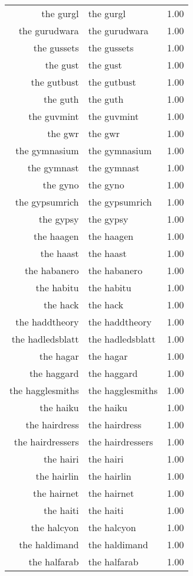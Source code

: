 \begin{table}[ht]
\begin{tabular}{rlr}
  the gurgl & the gurgl & 1.00 \\ 
  the gurudwara & the gurudwara & 1.00 \\ 
  the gussets & the gussets & 1.00 \\ 
  the gust & the gust & 1.00 \\ 
  the gutbust & the gutbust & 1.00 \\ 
  the guth & the guth & 1.00 \\ 
  the guvmint & the guvmint & 1.00 \\ 
  the gwr & the gwr & 1.00 \\ 
  the gymnasium & the gymnasium & 1.00 \\ 
  the gymnast & the gymnast & 1.00 \\ 
  the gyno & the gyno & 1.00 \\ 
  the gypsumrich & the gypsumrich & 1.00 \\ 
  the gypsy & the gypsy & 1.00 \\ 
  the haagen & the haagen & 1.00 \\ 
  the haast & the haast & 1.00 \\ 
  the habanero & the habanero & 1.00 \\ 
  the habitu & the habitu & 1.00 \\ 
  the hack & the hack & 1.00 \\ 
  the haddtheory & the haddtheory & 1.00 \\ 
  the hadledsblatt & the hadledsblatt & 1.00 \\ 
  the hagar & the hagar & 1.00 \\ 
  the haggard & the haggard & 1.00 \\ 
  the hagglesmiths & the hagglesmiths & 1.00 \\ 
  the haiku & the haiku & 1.00 \\ 
  the hairdress & the hairdress & 1.00 \\ 
  the hairdressers & the hairdressers & 1.00 \\ 
  the hairi & the hairi & 1.00 \\ 
  the hairlin & the hairlin & 1.00 \\ 
  the hairnet & the hairnet & 1.00 \\ 
  the haiti & the haiti & 1.00 \\ 
  the halcyon & the halcyon & 1.00 \\ 
  the haldimand & the haldimand & 1.00 \\ 
  the halfarab & the halfarab & 1.00 \\ 

\end{tabular}
\end{table}
